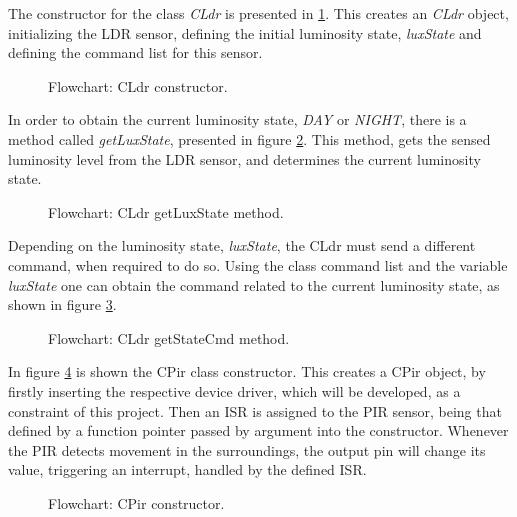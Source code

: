 \clearpage
{}

The constructor for the class \textit{CLdr} is presented in \ref{fig:CLdrconstructor}. This creates an \textit{CLdr} object, initializing the LDR sensor, defining the initial luminosity state, \textit{luxState} and defining the command list for this sensor.

\begin{figure}[H]
	\centering
	\caption{Flowchart: CLdr constructor.}
	\label{fig:CLdrconstructor}
\end{figure}

In order to obtain the current luminosity state, \textit{DAY} or \textit{NIGHT}, there is a method called \textit{getLuxState}, presented in figure \ref{fig:CLdrgetLuxState}. This method, gets the sensed luminosity level from the LDR sensor, and determines the current luminosity state.

\begin{figure}[H]
	\centering
	\caption{Flowchart: CLdr getLuxState method.}
	\label{fig:CLdrgetLuxState}
\end{figure}

Depending on the luminosity state, \textit{luxState}, the CLdr must send a different command, when required to do so. Using the class command list and the variable \textit{luxState} one can obtain the command related to the current luminosity state, as shown in figure \ref{fig:CLdrgetStateCmd}.

\begin{figure}[H]
	\centering
	\caption{Flowchart: CLdr getStateCmd method.}
	\label{fig:CLdrgetStateCmd}
\end{figure}

\clearpage
{}

In figure \ref{fig:CPirconstructor} is shown the CPir class constructor. This creates a CPir object, by firstly inserting the respective device driver, which will be developed, as a constraint of this project. Then an ISR is assigned to the PIR sensor, being that defined by a function pointer passed by argument into the constructor. Whenever the PIR detects movement in the surroundings, the output pin will change its value, triggering an interrupt, handled by the defined ISR.

\begin{figure}[H]
	\centering
	\caption{Flowchart: CPir constructor.}
	\label{fig:CPirconstructor}
\end{figure}


